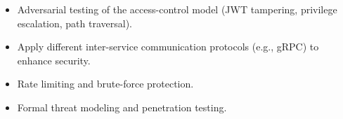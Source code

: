 \begin{itemize}
    \item Adversarial testing of the access-control model (JWT tampering, privilege escalation, path traversal).
    \item Apply different inter-service communication protocols (e.g., gRPC) to enhance security.
    \item Rate limiting and brute-force protection.
    \item Formal threat modeling and penetration testing.
\end{itemize}

